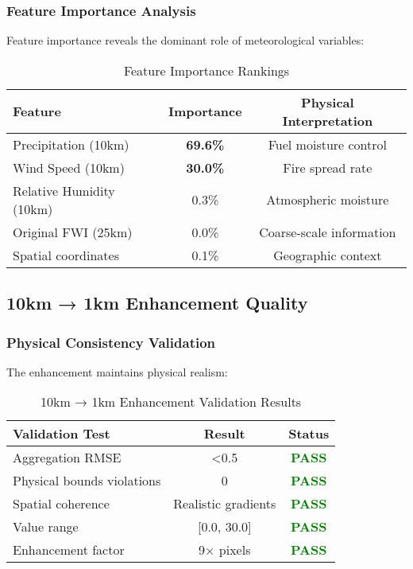 \documentclass[11pt,a4paper]{article}
\begin{document}
\subsubsection{Feature Importance Analysis}
Feature importance reveals the dominant role of meteorological variables:

\begin{table}[H]
\centering
\caption{Feature Importance Rankings}
\begin{tabular}{@{}lcc@{}}
\toprule
\textbf{Feature} & \textbf{Importance} & \textbf{Physical Interpretation} \\
\midrule
Precipitation (10km) & \textbf{69.6\%} & Fuel moisture control \\
Wind Speed (10km) & \textbf{30.0\%} & Fire spread rate \\
Relative Humidity (10km) & 0.3\% & Atmospheric moisture \\
Original FWI (25km) & 0.0\% & Coarse-scale information \\
Spatial coordinates & 0.1\% & Geographic context \\
\bottomrule
\end{tabular}
\label{tab:feature_importance}
\end{table}

\subsection{10km → 1km Enhancement Quality}

\subsubsection{Physical Consistency Validation}
The enhancement maintains physical realism:

\begin{table}[H]
\centering
\caption{10km → 1km Enhancement Validation Results}
\begin{tabular}{@{}lcc@{}}
\toprule
\textbf{Validation Test} & \textbf{Result} & \textbf{Status} \\
\midrule
Aggregation RMSE & <0.5 & \textcolor{green}{\textbf{PASS}} \\
Physical bounds violations & 0 & \textcolor{green}{\textbf{PASS}} \\
Spatial coherence & Realistic gradients & \textcolor{green}{\textbf{PASS}} \\
Value range & [0.0, 30.0] & \textcolor{green}{\textbf{PASS}} \\
Enhancement factor & 9× pixels & \textcolor{green}{\textbf{PASS}} \\
\bottomrule
\end{tabular}
\label{tab:enhancement_validation}
\end{table}
\end{document}
